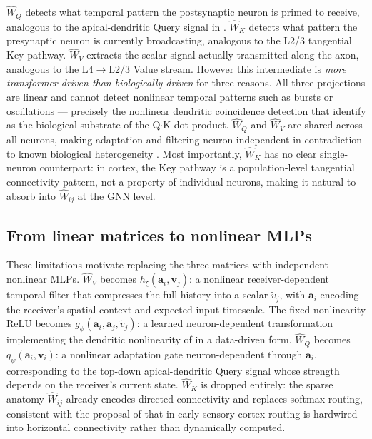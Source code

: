 \documentclass[11pt]{article}
\begin{document}
$\hat{W}_Q$ detects what temporal pattern the postsynaptic neuron is primed
to receive, analogous to the apical-dendritic Query signal in
\citet{konig2026}.
$\hat{W}_K$ detects what pattern the presynaptic neuron is currently
broadcasting, analogous to the L2/3 tangential Key pathway.
$\hat{W}_V$ extracts the scalar signal actually transmitted along the axon,
analogous to the L4$\to$L2/3 Value stream.
However this intermediate is \emph{more transformer-driven than biologically
driven} for three reasons.
All three projections are linear and cannot detect nonlinear temporal
patterns such as bursts or oscillations --- precisely the nonlinear
dendritic coincidence detection that \citet{konig2026} identify as the
biological substrate of the Q$\cdot$K dot product.
$\hat{W}_Q$ and $\hat{W}_V$ are shared across all neurons, making adaptation
and filtering neuron-independent in contradiction to known biological
heterogeneity \citep{konig2026}.
Most importantly, $\hat{W}_K$ has no clear single-neuron counterpart:
in cortex, the Key pathway is a population-level tangential connectivity
pattern, not a property of individual neurons, making it natural to absorb
into $\hat{W}_{ij}$ at the GNN level.

\subsection*{From linear matrices to nonlinear MLPs}

These limitations motivate replacing the three matrices with independent
nonlinear MLPs. $\hat{W}_V$ becomes $h_\xi(\mathbf{a}_i, \mathbf{v}_j)$:
a nonlinear receiver-dependent temporal filter that compresses the full
history into a scalar $\tilde{v}_j$, with $\mathbf{a}_i$ encoding the
receiver's spatial context and expected input timescale. The fixed
nonlinearity $\mathrm{ReLU}$ becomes $g_\phi(\mathbf{a}_i, \mathbf{a}_j,
\tilde{v}_j)$: a learned neuron-dependent transformation implementing the
dendritic nonlinearity of \citet{konig2026} in a data-driven form.
$\hat{W}_Q$ becomes $q_\psi(\mathbf{a}_i, \mathbf{v}_i)$: a nonlinear
adaptation gate neuron-dependent through $\mathbf{a}_i$, corresponding to
the top-down apical-dendritic Query signal whose strength depends on the
receiver's current state.
$\hat{W}_K$ is dropped entirely: the sparse anatomy $\hat{W}_{ij}$ already
encodes directed connectivity and replaces softmax routing, consistent with
the proposal of \citet{konig2026} that in early sensory cortex routing is
hardwired into horizontal connectivity rather than dynamically computed.
\end{document}
